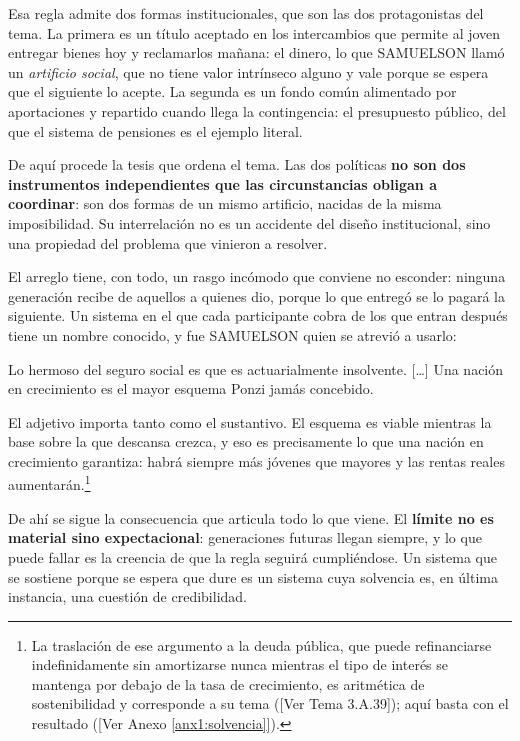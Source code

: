 \documentclass[10pt,a4paper]{article}
\newcommand{\authorfont}[1]{{\fontfamily{EBGaramond-TLF}\selectfont #1}}
\begin{document}
Esa regla admite dos formas institucionales, que son las dos protagonistas del tema. La primera es un título aceptado en los intercambios que permite al joven entregar bienes hoy y reclamarlos mañana: el dinero, lo que SAMUELSON llamó un \textit{artificio social}, que no tiene valor intrínseco alguno y vale porque se espera que el siguiente lo acepte. La segunda es un fondo común alimentado por aportaciones y repartido cuando llega la contingencia: el presupuesto público, del que el sistema de pensiones es el ejemplo literal.

De aquí procede la tesis que ordena el tema. Las dos políticas \textbf{no son dos instrumentos independientes que las circunstancias obligan a coordinar}: son dos formas de un mismo artificio, nacidas de la misma imposibilidad. Su interrelación no es un accidente del diseño institucional, sino una propiedad del problema que vinieron a resolver.

El arreglo tiene, con todo, un rasgo incómodo que conviene no esconder: ninguna generación recibe de aquellos a quienes dio, porque lo que entregó se lo pagará la siguiente. Un sistema en el que cada participante cobra de los que entran después tiene un nombre conocido, y fue SAMUELSON quien se atrevió a usarlo:

\begin{cita}[SAMUELSON][1967][Newsweek]
Lo hermoso del seguro social es que es actuarialmente insolvente. [\ldots] Una nación en crecimiento es el mayor esquema Ponzi jamás concebido.
\end{cita}

El adjetivo importa tanto como el sustantivo. El esquema es viable mientras la base sobre la que descansa crezca, y eso es precisamente lo que una nación en crecimiento garantiza: habrá siempre más jóvenes que mayores y las rentas reales aumentarán.\footnote{%
    La traslación de ese argumento a la deuda pública, que puede refinanciarse indefinidamente sin amortizarse nunca mientras el tipo de interés se mantenga por debajo de la tasa de crecimiento, es aritmética de sostenibilidad y corresponde a su tema ([\authorfont{Ver Tema 3.A.39}]); aquí basta con el resultado ([\authorfont{Ver Anexo \ref{anx1:solvencia}}]).
}

De ahí se sigue la consecuencia que articula todo lo que viene. El \textbf{límite no es material sino expectacional}: generaciones futuras llegan siempre, y lo que puede fallar es la creencia de que la regla seguirá cumpliéndose. Un sistema que se sostiene porque se espera que dure es un sistema cuya solvencia es, en última instancia, una cuestión de credibilidad.
\end{document}
